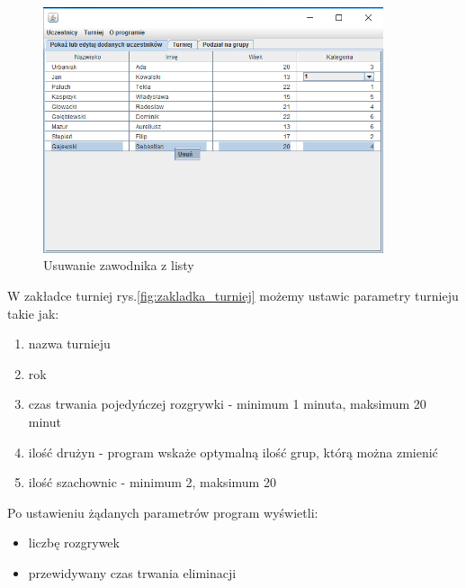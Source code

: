 \begin{figure}[H]
	\centering
	\includegraphics[width=10cm]{fig/6}
	\caption{Usuwanie zawodnika z listy}
	\label {fig:Usuwanie_zawodnika_z_listy} 
\end{figure}
W zakładce turniej rys.\ref{fig:zakladka_turniej} możemy ustawic parametry turnieju takie jak:
\begin{enumerate}
	\item nazwa turnieju
	\item rok
	\item czas trwania pojedyńczej rozgrywki - minimum 1 minuta, maksimum 20 minut
	\item ilość drużyn - program wskaże optymalną ilość grup, którą można zmienić
	\item ilość szachownic - minimum 2, maksimum 20 
\end{enumerate}
Po ustawieniu żądanych parametrów program wyświetli:
\begin{itemize}
	\item liczbę rozgrywek
	\item przewidywany czas trwania eliminacji
\end{itemize}



